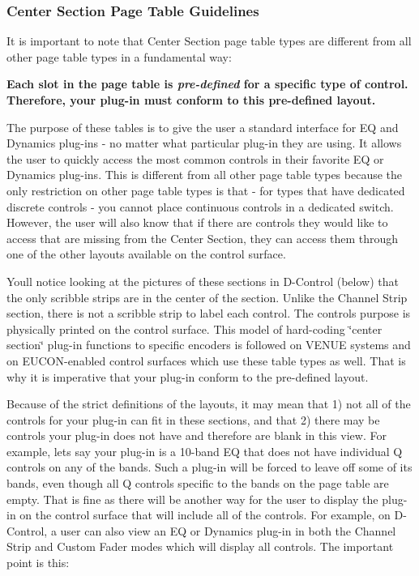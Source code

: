 \hypertarget{a00833_aax_page_table_guide_04_avid_center_section_page_tables_guidelines}{}\subsubsection{Center Section Page Table Guidelines}\label{a00833_aax_page_table_guide_04_avid_center_section_page_tables_guidelines}
 It is important to note that Center Section page table types are different from all other page table types in a fundamental way\+:

 {\bfseries{ Each slot in the page table is {\itshape pre-\/defined} for a specific type of control. Therefore, your plug-\/in must conform to this pre-\/defined layout.}} 

The purpose of these tables is to give the user a standard interface for EQ and Dynamics plug-\/ins -\/ no matter what particular plug-\/in they are using. It allows the user to quickly access the most common controls in their favorite EQ or Dynamics plug-\/ins. This is different from all other page table types because the only restriction on other page table types is that -\/ for types that have dedicated discrete controls -\/ you cannot place continuous controls in a dedicated switch. However, the user will also know that if there are controls they would like to access that are missing from the Center Section, they can access them through one of the other layouts available on the control surface.

You\textquotesingle{}ll notice looking at the pictures of these sections in D-\/\+Control (below) that the only scribble strips are in the center of the section. Unlike the Channel Strip section, there is not a scribble strip to label each control. The control\textquotesingle{}s purpose is physically printed on the control surface. This model of hard-\/coding \char`\"{}center section\char`\"{} plug-\/in functions to specific encoders is followed on V\+E\+N\+UE systems and on E\+U\+C\+O\+N-\/enabled control surfaces which use these table types as well. That is why it is imperative that your plug-\/in conform to the pre-\/defined layout.

Because of the strict definitions of the layouts, it may mean that 1) not all of the controls for your plug-\/in can fit in these sections, and that 2) there may be controls your plug-\/in does not have and therefore are blank in this view. For example, let\textquotesingle{}s say your plug-\/in is a 10-\/band EQ that does not have individual Q controls on any of the bands. Such a plug-\/in will be forced to leave off some of its bands, even though all Q controls specific to the bands on the page table are empty. That is fine as there will be another way for the user to display the plug-\/in on the control surface that will include all of the controls. For example, on D-\/\+Control, a user can also view an EQ or Dynamics plug-\/in in both the Channel Strip and Custom Fader modes which will display all controls. The important point is this\+:

